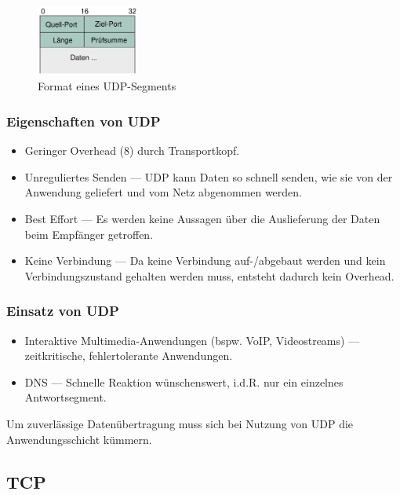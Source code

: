 \documentclass[a4paper, 14pt]{article}
\begin{document}
	\begin{figure}
		\begin{center}
			\includegraphics[width=0.3\textwidth]{images/06-udp-segment.png}
		\end{center}
		\caption{Format eines UDP-Segments}
	\end{figure}

	\subsubsection{Eigenschaften von UDP}

	\begin{itemize}
		\item Geringer Overhead (\SI{8}{\byte}) durch Transportkopf.
		\item Unreguliertes Senden --- UDP kann Daten so schnell senden, wie sie von der Anwendung geliefert und vom Netz abgenommen werden.
		\item Best Effort --- Es werden keine Aussagen über die Auslieferung der Daten beim Empfänger getroffen.
		\item Keine Verbindung --- Da keine Verbindung auf-/abgebaut werden und kein Verbindungszustand gehalten werden muss, entsteht dadurch kein Overhead.
	\end{itemize}

	\subsubsection{Einsatz von UDP}

	\begin{itemize}
		\item Interaktive Multimedia-Anwendungen (bspw. VoIP, Videostreams) --- zeitkritische, fehlertolerante Anwendungen.
		\item DNS --- Schnelle Reaktion wünschenswert, i.d.R. nur ein einzelnes Antwortsegment.
	\end{itemize}

	Um zuverlässige Datenübertragung muss sich bei Nutzung von UDP die Anwendungsschicht kümmern.


	\subsection{TCP}
\end{document}
